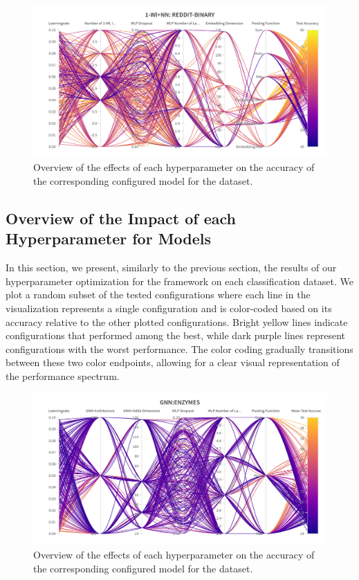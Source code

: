 \begin{figure}[H]
    \centering
    \includegraphics[width=\textwidth]{Figures/hyperparameter_wlnn_reddit.png}
    \vspace*{-30pt}
    \caption{Overview of the effects of each hyperparameter on the accuracy of the corresponding configured \wlnn model for the \reddit dataset.}
\end{figure}


\subsection{Overview of the Impact of each Hyperparameter for \gnn Models}
In this section, we present, similarly to the previous section, the results of our hyperparameter optimization for the \gnn framework on each classification dataset. We plot a random subset of the tested configurations where each line in the visualization represents a single configuration and is color-coded based on its accuracy relative to the other plotted configurations. Bright yellow lines indicate configurations that performed among the best, while dark purple lines represent configurations with the worst performance. The color coding gradually transitions between these two color endpoints, allowing for a clear visual representation of the performance spectrum.

\begin{figure}[H]
    \begin{center}
        \includegraphics[width=\textwidth]{Figures/hyperparameter_gnn_enzymes.png}
    \end{center}
    \vspace*{-30pt}
    \caption{Overview of the effects of each hyperparameter on the accuracy of the corresponding configured \gnn model for the \enzymes dataset.}
\end{figure}


